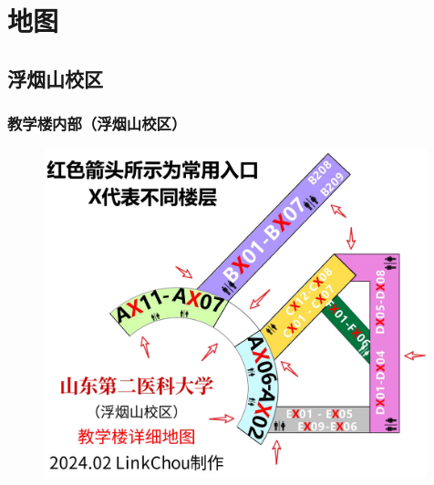 \chapter[地图]{地图}

\section[浮烟山校区]{浮烟山校区\footnotemark}

\subsection[教学楼内部（浮烟山校区）]{教学楼内部（浮烟山校区）}
\noindent\begin{figure}[H]
    \centering
    \vspace{1em}
    \includegraphics*[width=0.99\textwidth]{浮烟山校区教学楼.pdf}
    \label{map_t}
\end{figure}

\newpage
